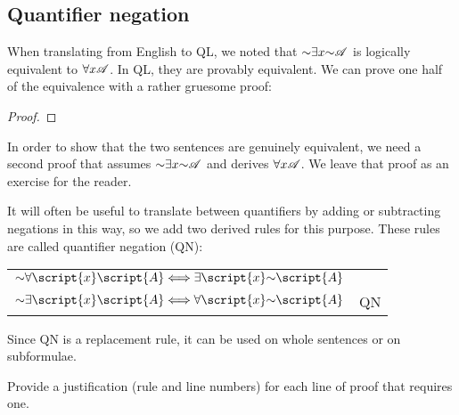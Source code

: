 \subsection{Quantifier negation}

When translating from English to QL, we noted that $\mathord{\sim}\exists x\mathord{\sim}\mathscr{A}$ is logically equivalent to $\forall x\mathscr{A}$. In QL, they are provably equivalent. We can prove one half of the equivalence with a rather gruesome proof:

\begin{proof}
	 
	\open
		\open
			\open
			\close
		\close
	\close
\end{proof}

In order to show that the two sentences are genuinely equivalent, we need a second proof that assumes $\mathord{\sim}\exists x\mathord{\sim}\mathscr{A}$ and derives $\forall x\mathscr{A}$. We leave that proof as an exercise for the reader.

It will often be useful to translate between quantifiers by adding or subtracting negations in this way, so we add two derived rules for this purpose. These rules are called quantifier negation (QN):
\begin{center}
\begin{tabular}{rl}
$\enot\forall\script{x}\script{A} \Longleftrightarrow \exists\script{x}\enot\script{A}$\\
$\enot\exists\script{x}\script{A} \Longleftrightarrow \forall\script{x}\enot\script{A}$
& QN
\end{tabular}
\end{center}
Since QN is a replacement rule, it can be used on whole sentences or on subformulae.



\practiceproblems

\setlength{\parindent}{0pt}

\problempart
\label{pr.justifyQLproof}
Provide a justification (rule and line numbers) for each line of proof that requires one.

